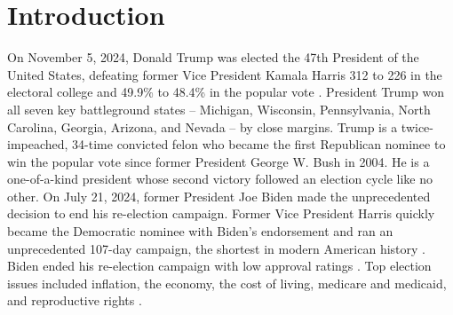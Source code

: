 \documentclass[letter]{article}
\begin{document}
\section{Introduction}\label{sec:intro}
On November 5, 2024, Donald Trump was elected the 47th President of the United States, defeating former Vice President Kamala Harris 312 to 226 in the electoral college and 49.9\% to 48.4\% in the popular vote \cite{cnn}. President Trump won all seven key battleground states – Michigan, Wisconsin, Pennsylvania, North Carolina, Georgia, Arizona, and Nevada – by close margins. Trump is a twice-impeached, 34-time convicted felon who became the first Republican nominee to win the popular vote since former President George W. Bush in 2004. He is a one-of-a-kind president whose second victory followed an election cycle like no other. On July 21, 2024, former President Joe Biden made the unprecedented decision to end his re-election campaign. Former Vice President Harris quickly became the Democratic nominee with Biden's endorsement and ran an unprecedented 107-day campaign, the shortest in modern American history \cite{reuters}. Biden ended his re-election campaign with low approval ratings \cite{mongrain}. Top election issues included inflation, the economy, the cost of living, medicare and medicaid, and reproductive rights \cite{gallup} \cite{pew1}. \\
\\
\end{document}
